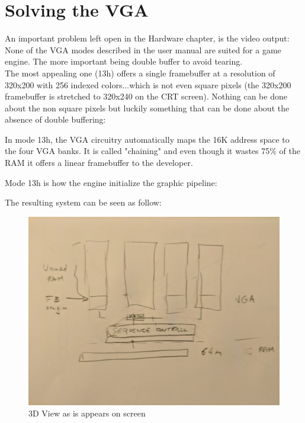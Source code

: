 \documentclass[book.tex]{subfiles}
\begin{document}
\section{Solving the VGA}\label{SetupPages}
An important problem left open in the Hardware chapter, is the video output: None of the VGA modes described in the user manual are suited for a game engine. The more important being double buffer to avoid tearing.\\

 The most appealing one (13h) offers a single framebuffer at a resolution of 320x200 with 256 indexed colors...which is not even square pixels (the 320x200 framebuffer is stretched to 320x240 on the CRT screen). Nothing can be done about the non square pixels but luckily something that can be done about the absence of double buffering:\\
\par
 In mode 13h, the VGA circuitry automatically maps the 16K address space to the four VGA banks. It is called "chaining" and even though it wastes 75\% of the RAM it offers a linear framebuffer to the developer.\\
 \par
 Mode 13h is how the engine initialize the graphic pipeline:\\
\par
 \begin{minipage}{\textwidth}

\end{minipage}
 \par

The resulting system can be seen as follow:\\

 \par
\begin{figure}[H]
\centering
 \includegraphics[width=\textwidth]{imgs/vga_layout/wasted_vga_ram.png}
 \caption{3D View as is appears on screen} \label{fig:vga_layout_in_3D}
 \end{figure}
\end{document}
